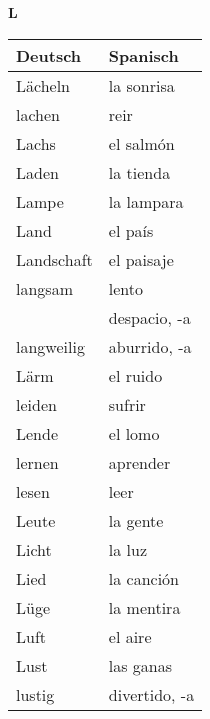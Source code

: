 \begin{flushright}\begin{Huge}\textbf{L}\end{Huge}\end{flushright}

\begin{longtable}{p{} p{}} 
\textbf{Deutsch}     & \textbf{Spanisch}                                       \\ \hline
\hline
\endhead %
Lächeln & la sonrisa\\
lachen & reir\\
Lachs & el salmón\\
Laden & la tienda\\
Lampe & la lampara\\
Land & el país\\
Landschaft & el paisaje\\
langsam & lento \\
~ & despacio, -a\\ 
langweilig & aburrido, -a\\
Lärm & el ruido \\
leiden & sufrir\\
Lende & el lomo\\
lernen & aprender\\
lesen & leer \\
Leute & la gente\\
Licht & la luz\\
Lied & la canción\\
Lüge & la mentira\\
Luft & el aire\\
Lust & las ganas\\
lustig & divertido, -a\\
\end{longtable}
